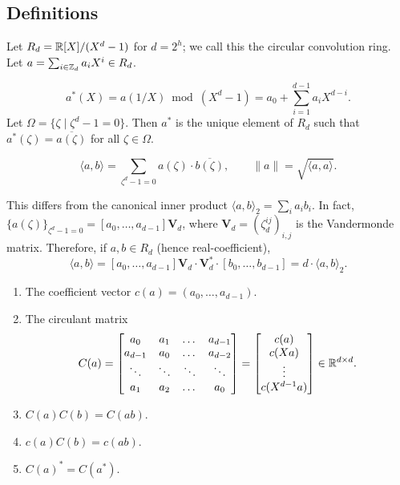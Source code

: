 \subsection{Definitions}

Let $R_d = \mathbb{R}[X]/(X^d - 1)$ for $d = 2^h$; we call this the circular convolution ring. Let $a = \sum_{i \in \mathbb{Z}_d} a_i X^i \in R_d$.

\begin{definition}[Adjoint]
	\[
		a^*(X) = a(1/X) \bmod (X^d - 1) = a_0 + \sum_{i=1}^{d-1} a_i X^{d-i}.
	\]
	Let $\Omega = \{\zeta \mid \zeta^d - 1 = 0\}$. Then $a^*$ is the unique element of $R_d$ such that $a^*(\zeta) = \overline{a(\zeta)}$ for all $\zeta \in \Omega$.
\end{definition}

\begin{definition}
	\[
		\langle a, b \rangle = \sum_{\zeta^d - 1 = 0} a(\zeta) \cdot \overline{b(\zeta)}, \qquad \|a\| = \sqrt{\langle a, a \rangle}.
	\]
\end{definition}

This differs from the canonical inner product $\langle a, b \rangle_2 = \sum_i a_i b_i$. In fact, $\{a(\zeta)\}_{\zeta^d - 1 = 0} = [a_0, \dots, a_{d-1}] \mathbf{V}_d$, where $\mathbf{V}_d = (\zeta_d^{ij})_{i,j}$ is the Vandermonde matrix. Therefore, if $a, b \in R_d$ (hence real-coefficient),
\[
	\langle a, b \rangle = [a_0, \dots, a_{d-1}] \mathbf{V}_d \cdot \mathbf{V}_d^* \cdot [b_0, \dots, b_{d-1}] = d \cdot \langle a, b \rangle_2.
\]

\begin{definition}
	\leavevmode\par
	\begin{enumerate}
		\item The coefficient vector $c(a) = (a_0, \dots, a_{d-1})$.
		\item The circulant matrix
		\[
			C(a) = \begin{bmatrix}
				a_0 & a_1 & \dots & a_{d-1} \\
				a_{d-1} & a_0 & \dots & a_{d-2} \\
				\ddots & \ddots & \ddots & \ddots \\
				a_1 & a_2 & \dots & a_0
			\end{bmatrix}
			=
			\begin{bmatrix}
				c(a) \\ c(Xa) \\ \vdots \\ c(X^{d-1}a)
			\end{bmatrix}
			\in \mathbb{R}^{d \times d}.
		\]
		\item $C(a) C(b) = C(ab)$.
		\item $c(a) C(b) = c(ab)$.
		\item $C(a)^* = C(a^*)$.
	\end{enumerate}
\end{definition}

